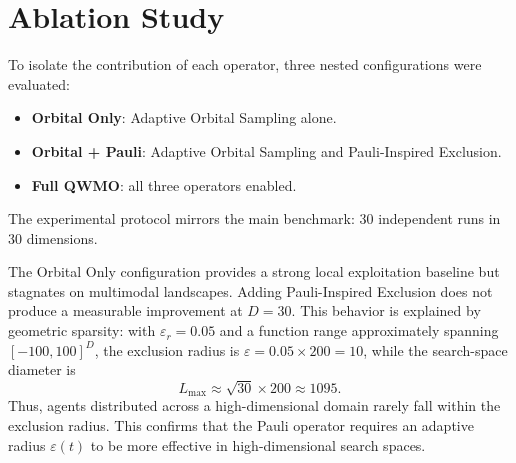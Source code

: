 \documentclass[final,5p,times,twocolumn]{elsarticle}
\begin{document}
\section{Ablation Study}
\label{sec:ablation}

To isolate the contribution of each operator, three nested
configurations were evaluated:

\begin{itemize}
    \item \textbf{Orbital Only}: Adaptive Orbital Sampling alone.
    \item \textbf{Orbital + Pauli}: Adaptive Orbital Sampling and
    Pauli-Inspired Exclusion.
    \item \textbf{Full QWMO}: all three operators enabled.
\end{itemize}

The experimental protocol mirrors the main benchmark:
30 independent runs in 30 dimensions.

\begin{table}[t]
\centering
\caption{
Ablation study results for QWMO variants
(mean $\pm$ standard deviation, 30D, 30 runs).
Bold values indicate the best ablation configuration.
}
\label{tab:ablation}
\renewcommand{\arraystretch}{1.12}
\end{table}

The Orbital Only configuration provides a strong local
exploitation baseline but stagnates on multimodal landscapes.
Adding Pauli-Inspired Exclusion does not produce a measurable
improvement at $D=30$. This behavior is explained by geometric
sparsity: with $\varepsilon_r=0.05$ and a function range
approximately spanning $[-100,100]^D$, the exclusion radius is
$\varepsilon=0.05\times200=10$, while the search-space diameter is
\[
L_{\max}\approx \sqrt{30}\times200\approx1095.
\]
Thus, agents distributed across a high-dimensional domain rarely
fall within the exclusion radius. This confirms that the Pauli
operator requires an adaptive radius $\varepsilon(t)$ to be more
effective in high-dimensional search spaces.
\end{document}
